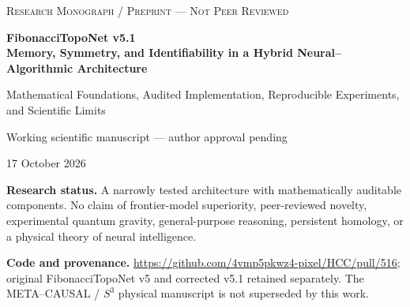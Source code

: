\documentclass[11pt,a4paper]{article}
\theoremstyle{plain}\newtheorem{theorem}{Theorem}[section]\newtheorem{proposition}[theorem]{Proposition}\newtheorem{lemma}[theorem]{Lemma}
\theoremstyle{definition}\newtheorem{definition}[theorem]{Definition}\newtheorem{remark}[theorem]{Remark}\newtheorem{counterexample}[theorem]{Counterexample}
\begin{document}
\begin{titlepage}
\centering\vspace*{25mm}
{\large\textsc{Research Monograph / Preprint --- Not Peer Reviewed}\par}
\vspace{14mm}
{\Huge\bfseries FibonacciTopoNet v5.1\\[4mm]
Memory, Symmetry, and Identifiability in a Hybrid Neural--Algorithmic Architecture\par}
\vspace{9mm}
{\large Mathematical Foundations, Audited Implementation, Reproducible Experiments, and Scientific Limits\par}
\vspace{16mm}
{\large Working scientific manuscript --- author approval pending\par}
\vspace{6mm}17 October 2026\par
\vfill
\begin{minipage}{0.87\linewidth}
\textbf{Research status.} A narrowly tested architecture with mathematically auditable components. No claim of frontier-model superiority, peer-reviewed novelty, experimental quantum gravity, general-purpose reasoning, persistent homology, or a physical theory of neural intelligence.
\par\medskip
\textbf{Code and provenance.} \url{https://github.com/4vmp5pkwz4-pixel/HCC/pull/516}; original FibonacciTopoNet v5 and corrected v5.1 retained separately. The META--CAUSAL / $S^3$ physical manuscript is not superseded by this work.
\end{minipage}
\vfill
\end{titlepage}
\end{document}
